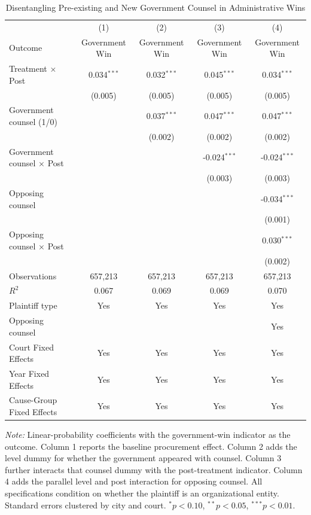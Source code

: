 \begin{table}[!htbp]
\setlength{\abovecaptionskip}{0pt}
\centering
\caption{Disentangling Pre-existing and New Government Counsel in Administrative Wins}
\label{tab:admin_case_level_lawyer_specs}
\begin{threeparttable}
\begin{tabular}{lcccc}
\toprule
 & (1) & (2) & (3) & (4) \\
Outcome & Government Win & Government Win & Government Win & Government Win \\
\midrule
Treatment $\times$ Post & 0.034$^{***}$ & 0.032$^{***}$ & 0.045$^{***}$ & 0.034$^{***}$ \\
& (0.005) & (0.005) & (0.005) & (0.005) \\
\addlinespace
Government counsel (1/0) &  & 0.037$^{***}$ & 0.047$^{***}$ & 0.047$^{***}$ \\
&  & (0.002) & (0.002) & (0.002) \\
Government counsel $\times$ Post &  &  & -0.024$^{***}$ & -0.024$^{***}$ \\
&  &  & (0.003) & (0.003) \\
Opposing counsel &  &  &  & -0.034$^{***}$ \\
&  &  &  & (0.001) \\
Opposing counsel $\times$ Post &  &  &  & 0.030$^{***}$ \\
&  &  &  & (0.002) \\
\addlinespace
Observations & 657,213 & 657,213 & 657,213 & 657,213 \\
$R^2$ & 0.067 & 0.069 & 0.069 & 0.070 \\
Plaintiff type & Yes & Yes & Yes & Yes \\
Opposing counsel &  &  &  & Yes \\
Court Fixed Effects & Yes & Yes & Yes & Yes \\
Year Fixed Effects & Yes & Yes & Yes & Yes \\
Cause-Group Fixed Effects & Yes & Yes & Yes & Yes \\
\bottomrule
\end{tabular}
\begin{tablenotes}[flushleft]
\footnotesize
\item \textit{Note:} Linear-probability coefficients with the government-win indicator as the outcome. Column 1 reports the baseline procurement effect. Column 2 adds the level dummy for whether the government appeared with counsel. Column 3 further interacts that counsel dummy with the post-treatment indicator. Column 4 adds the parallel level and post interaction for opposing counsel. All specifications condition on whether the plaintiff is an organizational entity. Standard errors clustered by city and court. $^{*}p<0.10$, $^{**}p<0.05$, $^{***}p<0.01$.
\end{tablenotes}
\end{threeparttable}
\end{table}
